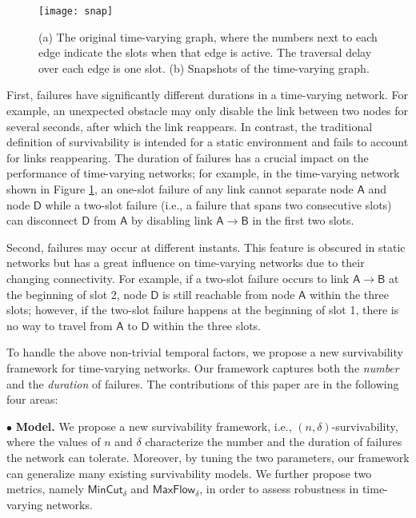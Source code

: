 \documentclass[10pt, conference, letterpaper]{IEEEtran}
\begin{document}
\begin{figure}[tbp]
\begin{center}
\texttt{[image: snap]}
\caption{(a) The original time-varying graph, where the numbers next to each edge indicate the slots when that edge is active. The traversal delay over each edge is one slot. (b) Snapshots of the time-varying graph.}
\label{snap}
\end{center}\vspace{-3mm}
\end{figure}

First, failures have significantly different durations in a time-varying network. For example, an unexpected obstacle may only disable the link between two nodes for several seconds, after which the link reappears. In contrast, the traditional definition of survivability is intended for a static environment and fails to account for links reappearing. The duration of failures has a crucial impact on the performance of time-varying networks; for example, in the time-varying network shown in Figure \ref{snap}, an one-slot failure of any link cannot separate node $\mathsf{A}$ and node $\mathsf{D}$ while a two-slot failure (i.e., a failure that spans two consecutive slots) can disconnect $\mathsf{D}$ from $\mathsf{A}$ by disabling link $\mathsf{A\rightarrow B}$ in the first two slots.

Second, failures may occur at different instants. This feature is obscured in static networks but has a great influence on time-varying networks due to their changing connectivity. For example, if a two-slot failure occurs to link $\mathsf{A\rightarrow B}$ at the beginning of slot 2, node $\mathsf{D}$ is still reachable from node $\mathsf{A}$ within the three slots; however, if the two-slot failure happens  at the beginning of slot 1, there is no way to travel from $\mathsf{A}$ to $\mathsf{D}$ within the three slots.

To handle the above non-trivial temporal factors, we propose a new survivability framework for time-varying networks. Our framework captures both the \emph{number} and the \emph{duration} of failures. The contributions of this paper are in the following four areas:

\noindent $\bullet$ {\textbf{Model.} We propose a new survivability framework, i.e., $(n,\delta)$-survivability, where the values of $n$ and $\delta$ characterize the number and the duration of failures the network can tolerate. Moreover, by tuning the two parameters, our framework can generalize many existing survivability models. We further propose two metrics, namely  $\mathsf{MinCut_{\delta}}$ and $\mathsf{MaxFlow_{\delta}}$, in order to assess robustness in time-varying networks. }
\end{document}
